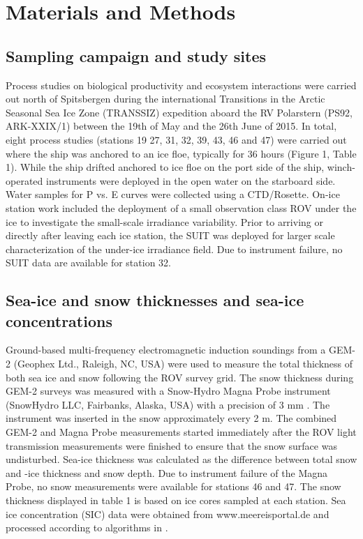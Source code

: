\documentclass[draft]{agujournal2018}
\begin{document}
\section{Materials and Methods}

\subsection{Sampling campaign and study sites}

Process studies on biological productivity and ecosystem interactions were carried out north of Spitsbergen during the international Transitions in the Arctic Seasonal Sea Ice Zone (TRANSSIZ) expedition aboard the RV Polarstern (PS92, ARK-XXIX/1) between the 19th of May and the 26th June of 2015. In total, eight process studies (stations 19 27, 31, 32, 39, 43, 46 and 47) were carried out where the ship was anchored to an ice floe, typically for 36 hours (Figure 1, Table 1). While the ship drifted anchored to ice floe on the port side of the ship, winch-operated instruments were deployed in the open water on the starboard side. Water samples for P vs. E curves were collected using a CTD/Rosette. On-ice station work included the deployment of a small observation class ROV under the ice to investigate the small-scale irradiance variability. Prior to arriving or directly after leaving each ice station, the SUIT was deployed for larger scale characterization of the under-ice irradiance field. Due to instrument failure, no SUIT data are available for station 32.

\subsection{Sea-ice and snow thicknesses and sea-ice concentrations}

Ground-based multi-frequency electromagnetic induction soundings from a GEM-2 (Geophex Ltd., Raleigh, NC, USA) were used to measure the total thickness of both sea ice and snow following the ROV survey grid. The snow thickness during GEM-2 surveys was measured with a Snow-Hydro Magna Probe instrument (SnowHydro LLC, Fairbanks, Alaska, USA) with a precision of 3 mm \citep{Sturm2006}. The instrument was inserted in the snow approximately every 2 m. The combined GEM-2 and Magna Probe measurements started immediately after the ROV light transmission measurements were finished to ensure that the snow surface was undisturbed. Sea-ice thickness was calculated as the difference between total snow and -ice thickness and snow depth. Due to instrument failure of the Magna Probe, no snow measurements were available for stations 46 and 47. The snow thickness displayed in table 1 is based on ice cores sampled at each station. Sea ice concentration (SIC) data were obtained from www.meereisportal.de and processed according to algorithms in \citet{Spreen2008}.
\end{document}
